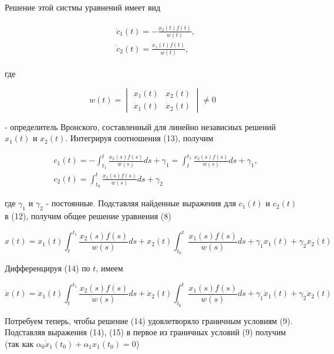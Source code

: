 \documentclass{article}
\theoremstyle{plain} \newtheorem*{theorem*}{Теорема}
\theoremstyle{plain} \newtheorem{theorem}{Теорема}[section]
\theoremstyle{defintition} \newtheorem*{corollary*}{Следствие}
\theoremstyle{plain} \newtheorem*{example*}{Пример}
\theoremstyle{plain} \newtheorem*{remark*}{Замечание}
\begin{document}
Решение этой систмы уравнений имеет вид

\begin{gather}
    \begin{split}
        & \dot{c}_1(t) = - \frac{x_2(t)f(t)}{w(t)}, \\
        & \dot{c}_2(t) = \frac{x_1(t)f(t)}{w(t)},
    \end{split}
\end{gather}

где

\begin{equation*}
    w(t) =
    \begin{vmatrix}
        x_1(t) & x_2(t) \\
        \dot{x}_1(t) & \dot{x}_2(t)
    \end{vmatrix}
    \ne 0
\end{equation*}

- определитель Вронского, составленный для линейно
независиых решений $x_1(t)$ и $x_2(t)$. Интегрируя
соотношения (13), получим

\begin{align*}
    & c_1(t)
    = - \int^t_{t_1} \frac{x_2(s)f(s)}{w(s)} ds + \gamma_1
    = \int^{t_1}_t \frac{x_2(s)f(s)}{w(s)} ds + \gamma_1, \\
    & c_2(t) = \int^t_{t_0} \frac{x_1(s)f(s)}{w(s)} ds + \gamma_2
\end{align*}

где $\gamma_1$ и $\gamma_2$ - постоянные.
Подставляя найденные выражения для $c_1(t)$ и $c_2(t)$ в (12),
получим общее решение уравнения (8)

\begin{equation}
    x(t) =
    x_1(t)\int^{t_1}_t \frac{x_2(s)f(s)}{w(s)} ds +
    x_2(t)\int^t_{t_0} \frac{x_1(s)f(s)}{w(s)} ds
    + \gamma_1 x_1(t)
    + \gamma_2 x_2(t)
\end{equation}

Дифференцируя (14) по $t$, имеем

\begin{equation}
    \dot{x}(t) =
    \dot{x}_1(t)\int^{t_1}_t \frac{x_2(s)f(s)}{w(s)} ds +
    \dot{x}_2(t)\int^t_{t_0} \frac{x_1(s)f(s)}{w(s)} ds
    + \gamma_1 \dot{x}_1(t)
    + \gamma_2 \dot{x}_2(t)
\end{equation}

Потребуем теперь, чтобы решение (14) удовлетворяло
граничным условиям (9). Подставляя выражения (14), (15)
в первое из граничных условий (9) получим
(так как $\alpha_0 \dot{x}_1(t_0) + \alpha_1 x_1(t_0) = 0$)
\end{document}

